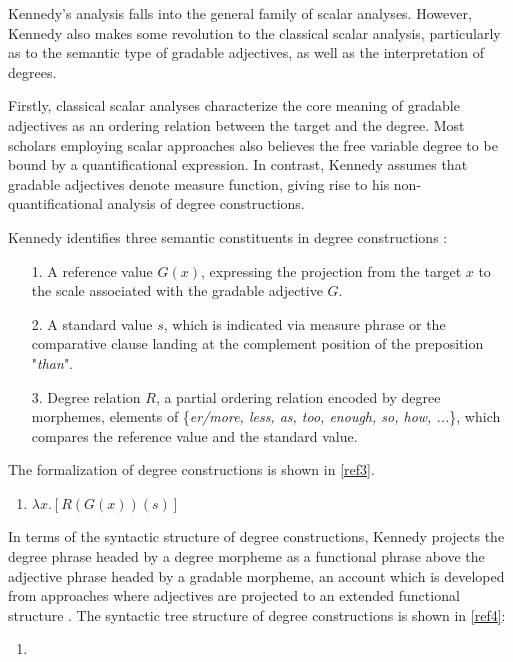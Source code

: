 \documentclass{ctexart}
\let \cite \parencite
\begin{document}
Kennedy’s analysis falls into the general family of scalar analyses. However, Kennedy also makes some revolution to the classical scalar analysis, particularly as to the semantic type of gradable adjectives, as well as the interpretation of degrees.

Firstly, classical scalar analyses characterize the core meaning of gradable adjectives as an ordering relation between the target and the degree. Most scholars employing scalar approaches also believes the free variable degree to be bound by a quantificational expression\cite{hellan1981,hoeksema1983,von1984a}. In contrast, Kennedy assumes that gradable adjectives denote measure function, giving rise to his non-quantificational analysis of degree constructions.

Kennedy identifies three semantic constituents in degree constructions \cite{russell1905}: 

\begin{itemize}
    \item[1.] A reference value $G(x)$, expressing the projection from the target $x$ to the scale associated with the gradable adjective $G$.
    \item[2.] A standard value $s$, which is indicated via measure phrase or the comparative clause landing at the complement position of the preposition "\textit{than}". 
    \item[3.] Degree relation $R$, a partial ordering relation encoded by degree morphemes, elements of \{\textit{er/more, less, as, too, enough, so, how, ...}\}, which compares the reference value and the standard value. 
\end{itemize}

The formalization of degree constructions is shown in \ref{ref3}.

\begin{enumerate}[resume]
\item \label{ref3} $\lambda x.[R(G(x))(s)]$
\end{enumerate}

In terms of the syntactic structure of degree constructions, Kennedy projects the degree phrase headed by a degree morpheme as a functional phrase above the adjective phrase headed by a gradable morpheme, an account which is developed from approaches where adjectives are projected to an extended functional structure \cite{abney1987,corver1990,corver1997b,grimshaw1991}. The syntactic tree structure of degree constructions is shown in \ref{ref4}:

\begin{enumerate}[resume]
\item \label{ref4}
\end{enumerate}
\end{document}
